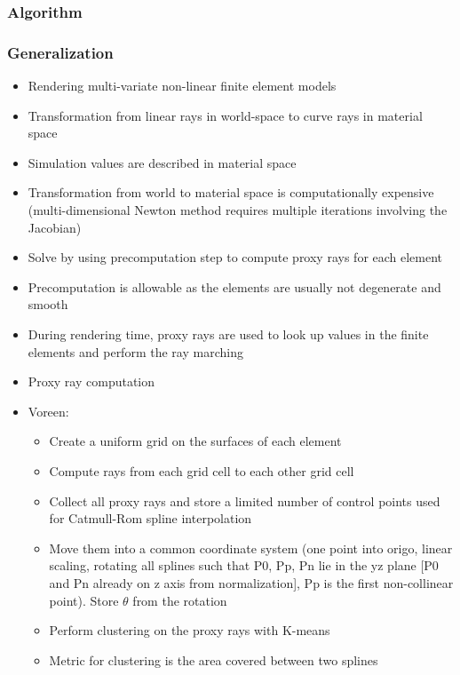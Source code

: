 \subsubsection{Algorithm}
\label{contributions:medbio:fem:algorithm}

\subsubsection{Generalization}
\label{contributions:medbio:fem:generalization}


\begin{itemize}
\item Rendering multi-variate non-linear finite element models
\item Transformation from linear rays in world-space to curve rays in material space
\item Simulation values are described in material space
\item Transformation from world to material space is computationally expensive (multi-dimensional Newton method requires multiple iterations involving the Jacobian)
\item Solve by using precomputation step to compute proxy rays for each element
\item Precomputation is allowable as the elements are usually not degenerate and smooth
\item During rendering time, proxy rays are used to look up values in the finite elements and perform the ray marching
\item Proxy ray computation
\item Voreen: \cite{meyer2009voreen}
\begin{itemize}
    \item Create a uniform grid on the surfaces of each element
    \item Compute rays from each grid cell to each other grid cell
    \item Collect all proxy rays and store a limited number of control points used for Catmull-Rom spline interpolation 
    \item Move them into a common coordinate system (one point into origo, linear scaling, rotating all splines such that P0, Pp, Pn lie in the yz plane [P0 and Pn already on z axis from normalization], Pp is the first non-collinear point). Store $\theta$ from the rotation
    \item Perform clustering on the proxy rays \cite{abraham03clustering} with K-means \cite{hartigan75kmeans}
    \item Metric for clustering is the area covered between two splines

\end{itemize}
\end{itemize}
